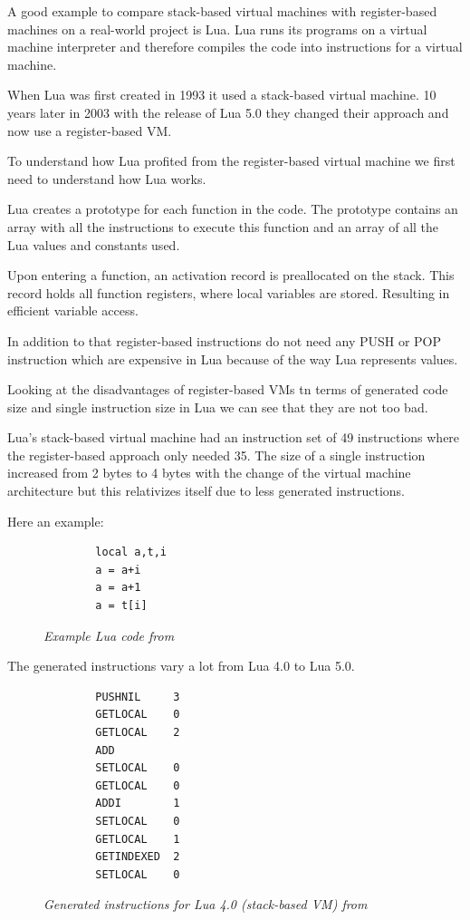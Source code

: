 \documentclass{article}
\begin{document}
A good example to compare stack-based virtual machines with register-based
machines on a real-world project is Lua. Lua runs its programs on a virtual
machine interpreter and therefore compiles the code into instructions for a
virtual machine.

When Lua was first created in 1993 it used a stack-based virtual machine. 10
years later in 2003 with the release of Lua 5.0 they changed their
approach and now use a register-based VM. ~\cite{lua_implementation}

To understand how Lua profited from the register-based virtual machine we first
need to understand how Lua works.

Lua creates a prototype for each function in the code. The prototype contains an
array with all the instructions to execute this function and an array of all the
Lua values and constants used. ~\cite{lua_implementation}

Upon entering a function, an activation record is preallocated on the stack.
This record holds all function registers, where local variables are stored.
Resulting in efficient variable access. ~\cite{lua_implementation}

In addition to that register-based instructions do not need any PUSH or POP
instruction which are expensive in Lua because of the way Lua represents
values.

Looking at the disadvantages of register-based VMs tn terms of generated code
size and single instruction size in Lua we can see that they are not too bad.

Lua's stack-based virtual machine had an instruction set of 49 instructions
where the register-based approach only needed 35. The size of a single
instruction increased from 2 bytes to 4 bytes with the change of the virtual
machine architecture but this relativizes itself due to less generated
instructions.

Here an example:

\begin{figure}[ht]
    \begin{verbatim}
        local a,t,i
        a = a+i
        a = a+1
        a = t[i]
    \end{verbatim}
    \caption{\textit{Example Lua code from ~\cite{lua_implementation}}}
    \label{fig:lua_code}
\end{figure}

The generated instructions vary a lot from Lua 4.0 to Lua 5.0.

\begin{figure}[ht]
    \begin{verbatim}
        PUSHNIL     3
        GETLOCAL    0
        GETLOCAL    2
        ADD
        SETLOCAL    0
        GETLOCAL    0
        ADDI        1
        SETLOCAL    0
        GETLOCAL    1
        GETINDEXED  2
        SETLOCAL    0
    \end{verbatim}
    \caption{\textit{Generated instructions for Lua 4.0 (stack-based VM) from ~\cite{lua_implementation}}}
    \label{fig:lua_generated4}
\end{figure}
\end{document}
